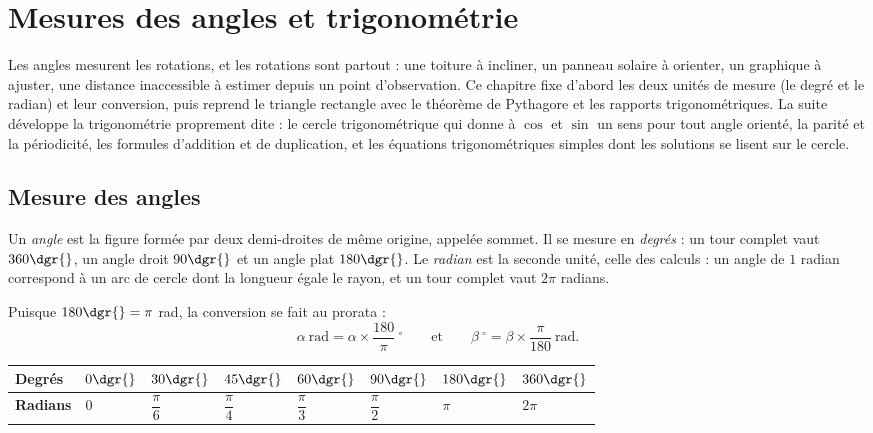 \chapter{Mesures des angles et trigonométrie}

\begin{quelqueslignes}
Les angles mesurent les rotations, et les rotations sont partout : une toiture à incliner, un panneau solaire à orienter, un graphique à ajuster, une distance inaccessible à estimer depuis un point d'observation. Ce chapitre fixe d'abord les deux unités de mesure (le degré et le radian) et leur conversion, puis reprend le triangle rectangle avec le théorème de Pythagore et les rapports trigonométriques. La suite développe la trigonométrie proprement dite : le cercle trigonométrique qui donne à $\cos$ et $\sin$ un sens pour tout angle orienté, la parité et la périodicité, les formules d'addition et de duplication, et les équations trigonométriques simples dont les solutions se lisent sur le cercle.
\end{quelqueslignes}

\section{Mesure des angles}

\begin{definition}
Un \emph{angle} est la figure formée par deux demi-droites de même origine, appelée sommet. Il se mesure en \emph{degrés} : un tour complet vaut $360\dgr{}$, un angle droit $90\dgr{}$ et un angle plat $180\dgr{}$. Le \emph{radian} est la seconde unité, celle des calculs : un angle de $1$ radian correspond à un arc de cercle dont la longueur égale le rayon, et un tour complet vaut $2\pi$ radians.
\end{definition}

\begin{propriete}
Puisque $180\dgr{} = \pi$ rad, la conversion se fait au prorata :
\[
\alpha\ \text{rad} = \alpha \times \frac{180}{\pi}\ {}^\circ
\qquad\text{et}\qquad
\beta\ {}^\circ = \beta \times \frac{\pi}{180}\ \text{rad} .
\]
\end{propriete}

\begin{center}
\small
\begin{tabular}{C{1.5cm}C{1.5cm}C{1.5cm}C{1.5cm}C{1.5cm}C{1.5cm}C{1.5cm}C{1.5cm}}
\toprule
{}\textbf{Degrés} & $0\dgr{}$ & $30\dgr{}$ & $45\dgr{}$ & $60\dgr{}$ & $90\dgr{}$ & $180\dgr{}$ & $360\dgr{}$\\
\midrule
\textbf{Radians} & $0$ & $\dfrac{\pi}{6}$ & $\dfrac{\pi}{4}$ & $\dfrac{\pi}{3}$ & $\dfrac{\pi}{2}$ & $\pi$ & $2\pi$\\
\bottomrule
\end{tabular}
\label{ch5:tab:angles}
\end{center}


